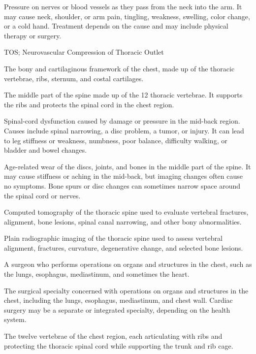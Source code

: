  Pressure on nerves or blood vessels as they pass from the neck into the arm. It may cause neck, shoulder, or arm pain, tingling, weakness, swelling, color change, or a cold hand. Treatment depends on the cause and may include physical therapy or surgery.

\synonyms
TOS; Neurovascular Compression of Thoracic Outlet

 The bony and cartilaginous framework of the chest, made up of the thoracic vertebrae, ribs, sternum, and costal cartilages.

 The middle part of the spine made up of the 12 thoracic vertebrae. It supports the ribs and protects the spinal cord in the chest region.

 Spinal-cord dysfunction caused by damage
  or pressure in the mid-back region. Causes include spinal narrowing, a
  disc problem, a tumor, or injury. It can lead to leg stiffness or
  weakness, numbness, poor balance, difficulty walking, or bladder and
  bowel changes.

 Age-related wear of the discs, joints,
  and bones in the middle part of the spine. It may cause stiffness or
  aching in the mid-back, but imaging changes often cause no symptoms.
  Bone spurs or disc changes can sometimes narrow space around the
  spinal cord or nerves.

 Computed tomography of the thoracic spine used to evaluate vertebral fractures, alignment, bone lesions, spinal canal narrowing, and other bony abnormalities.

 Plain radiographic imaging of the thoracic spine used to assess vertebral alignment, fractures, curvature, degenerative change, and selected bone lesions.

 A surgeon who performs operations on organs and structures in the chest, such as the lungs, esophagus, mediastinum, and sometimes the heart.

 The surgical specialty concerned with operations on organs and structures in the chest, including the lungs, esophagus, mediastinum, and chest wall. Cardiac surgery may be a separate or integrated specialty, depending on the health system.

 The twelve vertebrae of the chest region, each articulating with ribs and protecting the thoracic spinal cord while supporting the trunk and rib cage.

